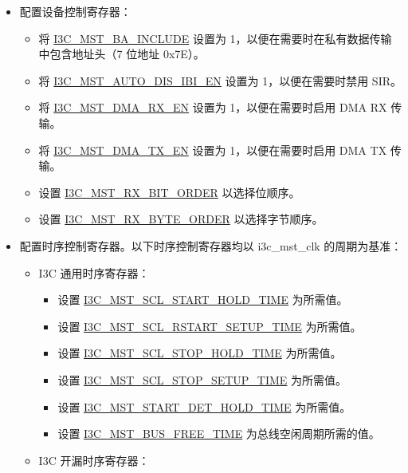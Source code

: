 \documentclass[main\_\_CN.tex]{subfiles}
\begin{document}
\begin{itemize}
    \item 配置设备控制寄存器：
    \begin{itemize}
        \item 将 \hyperref[fielddesc:I3CMSTREGBAINCLUDE]{I3C\_MST\_BA\_INCLUDE} 设置为 1，以便在需要时在私有数据传输中包含地址头（7 位地址 0x7E）。
        \item 将 \hyperref[fielddesc:I3CMSTREGAUTODISIBIEN]{I3C\_MST\_AUTO\_DIS\_IBI\_EN} 设置为 1，以便在需要时禁用 SIR。
        \item 将 \hyperref[fielddesc:I3CMSTREGDMARXEN]{I3C\_MST\_DMA\_RX\_EN} 设置为 1，以便在需要时启用 DMA RX 传输。
        \item 将 \hyperref[fielddesc:I3CMSTREGDMATXEN]{I3C\_MST\_DMA\_TX\_EN} 设置为 1，以便在需要时启用 DMA TX 传输。
        \item 设置 \hyperref[fielddesc:I3CMSTREGRXBITORDER]{I3C\_MST\_RX\_BIT\_ORDER} 以选择位顺序。
        \item 设置 \hyperref[fielddesc:I3CMSTREGRXBYTEORDER]{I3C\_MST\_RX\_BYTE\_ORDER} 以选择字节顺序。
    \end{itemize}
    \item 配置时序控制寄存器。以下时序控制寄存器均以 i3c\_mst\_clk 的周期为基准：
        \begin{itemize}
          \item I3C 通用时序寄存器：
          \begin{itemize}
              \item 设置 \hyperref[fielddesc:I3CMSTREGSCLSTARTHOLDTIME]{I3C\_MST\_SCL\_START\_HOLD\_TIME} 为所需值。
              \item 设置 \hyperref[fielddesc:I3CMSTREGSCLRSTARTSETUPTIME]{I3C\_MST\_SCL\_RSTART\_SETUP\_TIME} 为所需值。
              \item 设置 \hyperref[fielddesc:I3CMSTREGSCLSTOPHOLDTIME]{I3C\_MST\_SCL\_STOP\_HOLD\_TIME} 为所需值。
              \item 设置 \hyperref[fielddesc:I3CMSTREGSCLSTOPSETUPTIME]{I3C\_MST\_SCL\_STOP\_SETUP\_TIME} 为所需值。
              \item 设置 \hyperref[fielddesc:I3CMSTREGSTARTDETHOLDTIME]{I3C\_MST\_START\_DET\_HOLD\_TIME} 为所需值。
              \item 设置 \hyperref[fielddesc:I3CMSTREGBUSFREETIME]{I3C\_MST\_BUS\_FREE\_TIME} 为总线空闲周期所需的值。
          \end{itemize}
          \item I3C 开漏时序寄存器：

\end{itemize}
\end{itemize}
\end{document}
